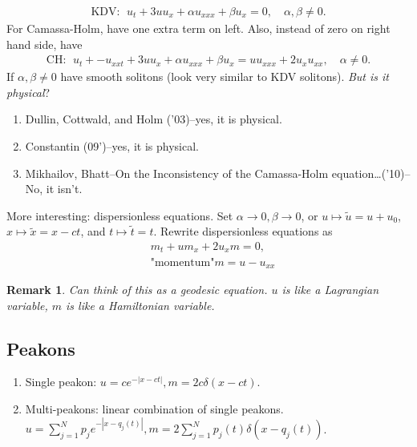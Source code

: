 \documentclass[12pt,reqno]{amsart}
\numberwithin{equation}{section}  %
\newtheorem{remark}[theorem]{Remark}
\begin{document}
%
\begin{equation*}
    \begin{split}
	\text{KDV}: \ \
	u_{t} + 3 uu_{x} + \alpha u_{xxx} + \beta u_{x} = 0, \quad \alpha,
	\beta \neq 0.
    \end{split}
\end{equation*}
%
%
For Camassa-Holm, have one extra term on left. Also,
instead of zero on right hand side, have
%
%
\begin{equation*}
    \begin{split}
	\text{CH}: \ \
	u_{t} + - u_{xxt} + 3 uu_{x} + \alpha u_{xxx} + \beta u_{x} = uu_{xxx} + 2
	u_{x} u_{xx}, \quad \alpha \neq 0.
    \end{split}
\end{equation*}
%
%
If $\alpha, \beta \neq 0$ have smooth solitons (look very similar to KDV
solitons). \emph{But is it physical}?
\begin{enumerate}
    \item Dullin, Cottwald, and Holm ('03)--yes, it is physical. 
    \item Constantin (09')--yes, it is physical.
    \item Mikhailov, Bhatt--On the Inconsistency of the Camassa-Holm
	equation\ldots('10)--No, it isn't.
\end{enumerate}
More interesting: dispersionless equations. Set $\alpha \to 0, \beta \to
0$, or $u \mapsto \tilde{u} = u + u_{0}$, $x \mapsto \tilde{x} = x -
ct$, and $t \mapsto \tilde{t} = t$. Rewrite dispersionless equations as
%
%
\begin{equation*}
    \begin{split}
	& m_{t} + um_{x} + 2 u_{x}m =0,
	\\
	& \text{"momentum"} m = u - u_{xx}
    \end{split}
\end{equation*}
%
%
%
%
\begin{remark}
    Can think of this as a geodesic equation. $u$ is like a Lagrangian
    variable, $m$ is like a Hamiltonian variable.
\end{remark}
%
%


\subsection{Peakons} 
\label{ssec:peakons}
\begin{enumerate}
    \item Single peakon: $u = ce^{-| x -ct |}, m = 2 c \delta(x -ct)$.
    \item Multi-peakons: linear combination of single peakons. $u =
	\sum_{j=1}^{N} p_{j}e^{-| x - q_{j}(t) |}, m = 2 \sum_{j
	    =1}^{N} p_{j}(t) \delta(x - q_{j}(t))$.
\end{enumerate}
\end{document}
